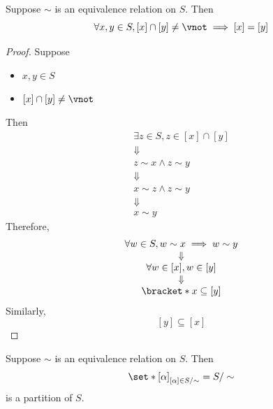 \begin{lemma} \label{an1:lem:equivalence-class-intersection}
  Suppose $\sim$ is an equivalence relation on $S$. Then
  \[
    \forall x, y \in S, [x] \cap [y] \neq \vnot \implies [x] = [y]
  \]
\end{lemma}

\begin{proof}
  Suppose
  \begin{itemize}
    \item $x, y \in S$
    \item $[x] \cap [y] \neq \vnot$
  \end{itemize}
  Then
  \[
    \begin{array}{c}
      \exists z \in S, z \in [x] \cap [y] \\
      \Downarrow                          \\
      z \sim x \land z \sim y             \\
      \Downarrow                          \\
      x \sim z \land z \sim y             \\
      \Downarrow                          \\
      x \sim y
    \end{array}
  \]
  Therefore,
  \[
    \begin{array}{c}
      \forall w \in S, w \sim x \implies w \sim y \\
      \Downarrow                                  \\
      \forall w \in [x], w \in [y]                \\
      \Downarrow                                  \\
      \bracket*{x} \subseteq [y]
    \end{array}
  \]
  Similarly,
  \[
    [y] \subseteq [x]
  \]
\end{proof}

\begin{theorem} \label{an1:thm:equivalence-relation-defines-partition}
  Suppose $\sim$ is an equivalence relation on $S$. Then
  \[
    \set*{[\alpha]}_{[\alpha] \in S / \sim} = S / \sim
  \]
  is a partition of $S$.
\end{theorem}

